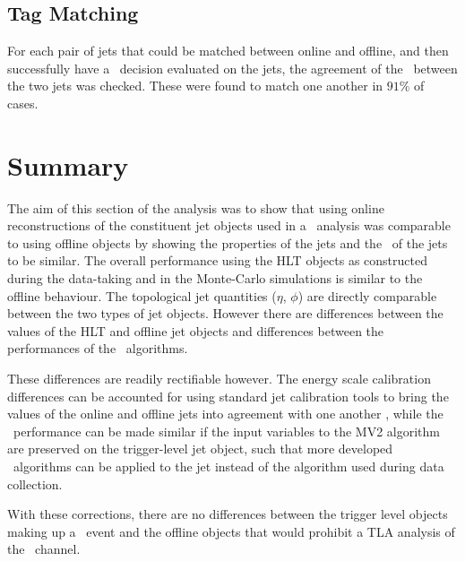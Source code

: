 	\subsection{Tag Matching}

	For each pair of jets that could be matched between online and offline, and then successfully have a \btag\, decision evaluated on the jets, the agreement of the \btag\, between the two jets was checked. These were found to match one another in $91\%$ of cases.

	\section{Summary}

	The aim of this section of the analysis was to show that using online reconstructions of the constituent jet objects used in a \VBFHBB\ analysis was comparable to using offline objects by showing the properties of the jets and the \btag\ of the jets to be similar. The overall performance using the HLT objects as constructed during the data-taking and in the Monte-Carlo simulations is similar to the offline behaviour. The topological jet quantities ($\eta$, $\phi$) are directly comparable between the two types of jet objects. However there are differences between the \pt values of the HLT and offline jet objects and differences between the performances of the \btag\ algorithms.

	These differences are readily rectifiable however. The energy scale calibration differences can be accounted for using standard jet calibration tools to bring the \pt values of the online and offline jets into agreement with one another \cite{JES}, while the \btag\ performance can be made similar if the input variables to the MV2 algorithm are preserved on the trigger-level jet object, such that more developed \btag\ algorithms can be applied to the jet instead of the algorithm used during data collection.

	With these corrections, there are no differences between the trigger level objects making up a \VBFHBB\ event and the offline objects that would prohibit a TLA analysis of the \VBFHBB\ channel.

\endinput
